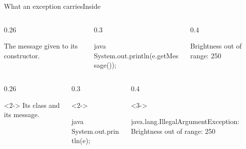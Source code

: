 \documentclass[\deckoptions]{beamer}
\begin{document}
\begin{frame}[fragile]{What an exception carries}{Inside }
  \begin{boxrow}
  \begin{columns}[c, onlytextwidth]
    \begin{column}{0.26\textwidth}
      \begin{card}{}
        The message given to its constructor.
      \end{card}
    \end{column}
    \begin{column}{0.3\textwidth}
\begin{codeblock}[dense]{java}
System.out.println(e.getMessage());
\end{codeblock}
    \end{column}
    \begin{column}{0.4\textwidth}
\begin{console}[dense]
Brightness out of range: 250
\end{console}
    \end{column}
  \end{columns}
  \end{boxrow}
  \boxrowgap
  \begin{boxrow}
  \begin{columns}[c, onlytextwidth]
    \begin{column}{0.26\textwidth}
      \begin{card}<2->{}
        Its class and its message.
      \end{card}
    \end{column}
    \begin{column}{0.3\textwidth}
      \begin{uncoverenv}<2->
\begin{codeblock}[dense]{java}
System.out.println(e);
\end{codeblock}
      \end{uncoverenv}
    \end{column}
    \begin{column}{0.4\textwidth}
      \begin{uncoverenv}<3->
\begin{console}[dense]
java.lang.IllegalArgumentException:
  Brightness out of range: 250
\end{console}

\end{uncoverenv}
\end{column}
\end{columns}
\end{boxrow}
\end{frame}
\end{document}

